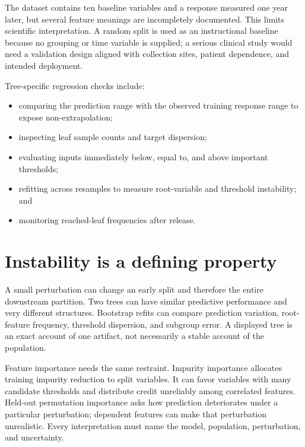 The dataset contains ten baseline variables and a response measured one year
later, but several feature meanings are incompletely documented. This limits
scientific interpretation. A random split is used as an instructional baseline
because no grouping or time variable is supplied; a serious clinical study
would need a validation design aligned with collection sites, patient
dependence, and intended deployment.

Tree-specific regression checks include:
\begin{itemize}
  \item comparing the prediction range with the observed training response
  range to expose non-extrapolation;
  \item inspecting leaf sample counts and target dispersion;
  \item evaluating inputs immediately below, equal to, and above important
  thresholds;
  \item refitting across resamples to measure root-variable and threshold
  instability; and
  \item monitoring reached-leaf frequencies after release.
\end{itemize}

\section{Instability is a defining property}

A small perturbation can change an early split and therefore the entire
downstream partition. Two trees can have similar predictive performance and
very different structures. Bootstrap refits can compare prediction variation,
root-feature frequency, threshold dispersion, and subgroup error. A displayed
tree is an exact account of one artifact, not necessarily a stable account of
the population.

Feature importance needs the same restraint. Impurity importance allocates
training impurity reduction to split variables. It can favor variables with
many candidate thresholds and distribute credit unreliably among correlated
features. Held-out permutation importance asks how prediction deteriorates
under a particular perturbation; dependent features can make that perturbation
unrealistic. Every interpretation must name the model, population,
perturbation, and uncertainty.


